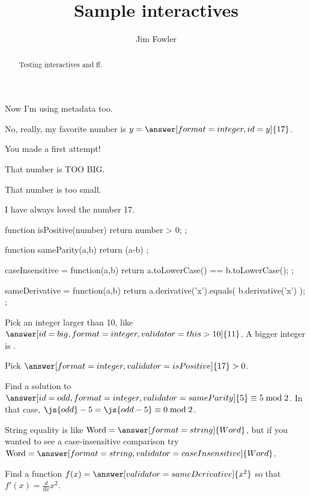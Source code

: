 \documentclass{ximera}
\title{Sample interactives}
\author{Jim Fowler}
\begin{document}
\begin{abstract}
Testing interactives and ff.
\end{abstract}
\maketitle

Now I'm using metadata too.

\begin{problem}
  No, really, my favorite number is $y = \answer[format=integer,id=y]{17}$.

  \begin{feedback}[attempt]
    You made a first attempt!
  \end{feedback}

  \begin{feedback}[y>17]
    That number is TOO BIG.
  \end{feedback}

  \begin{feedback}[y<17]
    That number is too small.
  \end{feedback}

  \begin{feedback}[correct]
    I have always loved the number 17.
  \end{feedback}
\end{problem}

\begin{javascript}
  function isPositive(number) {
    return number > 0;
  };

  function sameParity(a,b) {
    return (a-b)%
  };

  caseInsensitive = function(a,b) {
    return a.toLowerCase() == b.toLowerCase();
  };

  sameDerivative = function(a,b) {
    return a.derivative('x').equals( b.derivative('x') );
  };
\end{javascript}

\begin{problem}
  Pick an integer larger than 10, like $\answer[id=big,format=integer,validator=this>10]{11}$.  A bigger integer is .

  Pick $\answer[format=integer,validator=isPositive]{17} > 0$.

  Find a solution to $\answer[id=odd,format=integer,validator=sameParity]{5} \equiv 5 \bmod 2$.  In that case, $\js{odd} - 5 = \js{odd-5} \equiv 0 \bmod 2$.

  String equality is like $\mbox{Word} = \answer[format=string]{Word}$, but if you wanted to see a case-insensitive comparison try $\mbox{Word} = \answer[format=string,validator=caseInsensitive]{Word}$.

  Find a function $f(x) = \answer[validator=sameDerivative]{x^2}$ so that $f'(x) = \frac{d}{dx} x^2$.
\end{problem}
\end{document}
